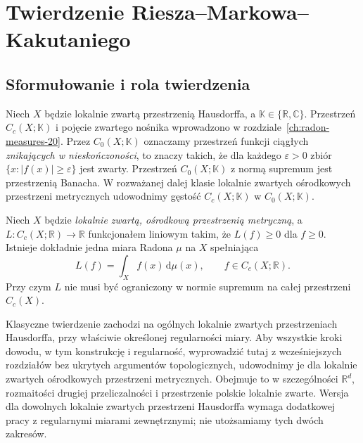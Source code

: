\chapter{Twierdzenie Riesza--Markowa--Kakutaniego}
\label{ch:riesz-markov-21}

\section{Sformułowanie i rola twierdzenia}
Niech $X$ będzie lokalnie zwartą przestrzenią Hausdorffa,
a $\mathbb K\in\{\mathbb R,\mathbb C\}$.
Przestrzeń $C_c(X;\mathbb K)$ i pojęcie zwartego nośnika
wprowadzono w rozdziale~\ref{ch:radon-measures-20}.
Przez $C_0(X;\mathbb K)$ oznaczamy przestrzeń funkcji ciągłych
\emph{znikających w nieskończoności}, to znaczy takich, że
dla każdego $\varepsilon>0$ zbiór
$\{x:|f(x)|\ge\varepsilon\}$ jest zwarty.
Przestrzeń $C_0(X;\mathbb K)$ z normą supremum jest przestrzenią
Banacha. W rozważanej dalej klasie lokalnie zwartych
ośrodkowych przestrzeni metrycznych udowodnimy gęstość
$C_c(X;\mathbb K)$ w $C_0(X;\mathbb K)$.

\begin{twierdzenie}
\label{thm:riesz-positive-21}
Niech $X$ będzie \emph{lokalnie zwartą, ośrodkową przestrzenią
metryczną}, a $L:C_c(X;\mathbb R)\to\mathbb R$ funkcjonałem
liniowym takim, że $L(f)\ge0$ dla $f\ge0$.
Istnieje dokładnie jedna miara Radona $\mu$ na $X$ spełniająca
\begin{equation}\label{eq:riesz-representation-21}
 L(f)=\int_X f(x)\,\mathrm d\mu(x),\qquad f\in C_c(X;\mathbb R).
\end{equation}
Przy czym $L$ nie musi być ograniczony w normie supremum na
całej przestrzeni $C_c(X)$.
\end{twierdzenie}

\begin{uwaga}
Klasyczne twierdzenie zachodzi na ogólnych lokalnie zwartych
przestrzeniach Hausdorffa, przy właściwie określonej regularności
miary. Aby wszystkie kroki dowodu, w tym konstrukcję i regularność,
wyprowadzić tutaj z wcześniejszych rozdziałów bez ukrytych
argumentów topologicznych, udowodnimy je dla lokalnie zwartych
ośrodkowych przestrzeni metrycznych. Obejmuje to w szczególności
$\mathbb R^d$, rozmaitości drugiej przeliczalności i przestrzenie
polskie lokalnie zwarte. Wersja dla dowolnych lokalnie zwartych
przestrzeni Hausdorffa wymaga dodatkowej pracy z regularnymi
miarami zewnętrznymi; nie utożsamiamy tych dwóch zakresów.
\end{uwaga}


